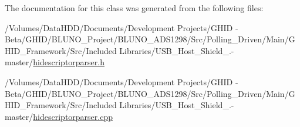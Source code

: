 \-The documentation for this class was generated from the following files\-:\begin{DoxyCompactItemize}
\item 
/\-Volumes/\-Data\-H\-D\-D/\-Documents/\-Development Projects/\-G\-H\-I\-D -\/ Beta/\-G\-H\-I\-D/\-B\-L\-U\-N\-O\-\_\-\-Project/\-B\-L\-U\-N\-O\-\_\-\-A\-D\-S1298/\-Src/\-Polling\-\_\-\-Driven/\-Main/\-G\-H\-I\-D\-\_\-\-Framework/\-Src/\-Included Libraries/\-U\-S\-B\-\_\-\-Host\-\_\-\-Shield\-\_.-\/master/\hyperlink{hidescriptorparser_8h}{hidescriptorparser.\-h}\item 
/\-Volumes/\-Data\-H\-D\-D/\-Documents/\-Development Projects/\-G\-H\-I\-D -\/ Beta/\-G\-H\-I\-D/\-B\-L\-U\-N\-O\-\_\-\-Project/\-B\-L\-U\-N\-O\-\_\-\-A\-D\-S1298/\-Src/\-Polling\-\_\-\-Driven/\-Main/\-G\-H\-I\-D\-\_\-\-Framework/\-Src/\-Included Libraries/\-U\-S\-B\-\_\-\-Host\-\_\-\-Shield\-\_.-\/master/\hyperlink{hidescriptorparser_8cpp}{hidescriptorparser.\-cpp}\end{DoxyCompactItemize}
